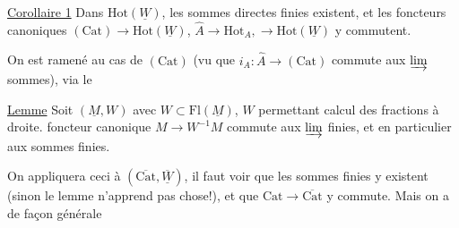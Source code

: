 \uline{Corollaire 1} Dans $\mathrm{Hot}(\underline W)$, les sommes directes finies existent, et les foncteurs canoniques $(\mathrm{Cat})\longrightarrow\mathrm{Hot}(\underline W)$, $\widehat A\longrightarrow\mathrm{Hot}_A,\longrightarrow\mathrm{Hot}(\underline W)$ y commutent.


On est ramené au cas de $(\mathrm{Cat})$ (vu que $i_A:\widehat A\longrightarrow(\mathrm{Cat})$ commute aux $\varinjlim$  sommes), via le

\margin{$|$}\uline{Lemme} Soit $(\underline M,W)$ avec $W\subset\mathrm{Fl}(\underline M)$, $W$ permettant calcul des fractions à droite.    foncteur canonique $M\longrightarrow W^{-1}M$ commute aux $\varinjlim$ finies,  et en particulier aux sommes finies.

On appliquera ceci à $(\overline{\mathrm{Cat}},\overline{\underline W})$, il faut voir que les sommes finies y existent (sinon le lemme n'apprend pas  chose!), et que $\mathrm{Cat}\longrightarrow\overline{\mathrm{Cat}}$ y commute.  Mais on a de façon générale
